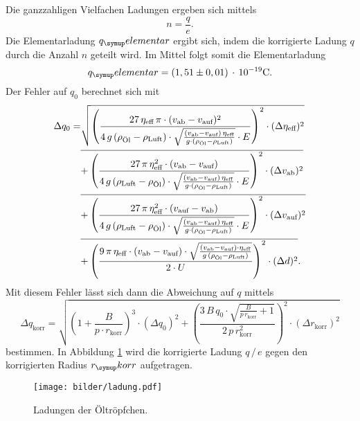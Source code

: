 Die ganzzahligen Vielfachen Ladungen ergeben sich mittels
\begin{equation}
  n = \frac{q}{e}.
\end{equation}
Die Elementarladung $q_\su{elementar}$ ergibt sich, indem die korrigierte Ladung $q$ durch die Anzahl $n$ geteilt wird.
Im Mittel folgt somit die Elementarladung
\begin{equation}
  q_\su{elementar} = (1,51\pm0,01)\,\cdot\,10^{-19}\si{\coulomb}.
\end{equation}
Der Fehler auf $q_0$ berechnet sich mit
\begin{align}
 \Delta q_\text{0} = &\sqrt{\left(
\frac{27\,\eta_\text{eff}\,\pi\cdot(v_\text{ab} -
v_\text{auf})^2}{4\,g\,(\rho_\text{Öl} - \rho_\text{Luft}) \cdot \sqrt{
\frac{(v_\text{ab} -
v_\text{auf})\,\eta_\text{eff}}{g\cdot(\rho_\text{Öl} -
\rho_\text{Luft})}} \cdot E} \right)^2 \cdot
(\Delta\eta_\text{eff})^2}\notag \\
 &\overline{+ \left( \frac{27\,\pi\,\eta_\text{eff}^2\cdot(v_\text{ab} -
v_\text{auf})}{4\,g\,(\rho_\text{Luft} - \rho_\text{Öl}) \cdot \sqrt{
\frac{(v_\text{ab} -
v_\text{auf})\,\eta_\text{eff}}{g\cdot(\rho_\text{Öl} -
\rho_\text{Luft})}} \cdot E} \right)^2 \cdot (\Delta
v_\text{ab})^2}\notag \\
 &\overline{+ \left( \frac{27\,\pi\,\eta_\text{eff}^2\cdot(v_\text{auf} -
v_\text{ab})}{4\,g\,(\rho_\text{Luft} - \rho_\text{Öl}) \cdot \sqrt{
\frac{(v_\text{ab} -
v_\text{auf})\,\eta_\text{eff}}{g\cdot(\rho_\text{Öl} -
\rho_\text{Luft})}} \cdot E}  \right)^2 \cdot (\Delta
v_\text{auf})^2}\notag \\
 &\overline{+ \left( \frac{9\,\pi\,\eta_\text{eff}\cdot(v_\text{ab} -
v_\text{auf})\cdot\sqrt{\frac{(v_\text{ab} -
v_\text{auf})\cdot\eta_\text{eff}}{g\,(\rho_\text{Öl} -
\rho_\text{Luft})}}}{2\cdot U}\right)^2 \cdot (\Delta d)^2}.
\end{align}
Mit diesem Fehler lässt sich dann die Abweichung auf $q$ mittels
\begin{equation}
 \Delta q_\text{korr} = \sqrt{\left(1 + \frac{B}{p\cdot
r_\text{korr}}\right)^3 \cdot (\Delta q_\text{0})^2 +
\left(\frac{3\,B\,q_\text{0} \cdot \sqrt{\frac{B}{p\,r_\text{korr}} +
1}}{2\,p\,r_\text{korr}^2}\right)^2\cdot (\Delta r_\text{korr})^2}
\end{equation}
bestimmen.
In Abbildung \ref{fig:ladung} wird die korrigierte Ladung $q\,/\,e$ gegen
den korrigierten Radius $r_\su{korr}$ aufgetragen.
\begin{figure}[H]
  \centering
  \texttt{[image: bilder/ladung.pdf]}
  \caption{Ladungen der Öltröpfchen.}
  \label{fig:ladung}
\end{figure}
